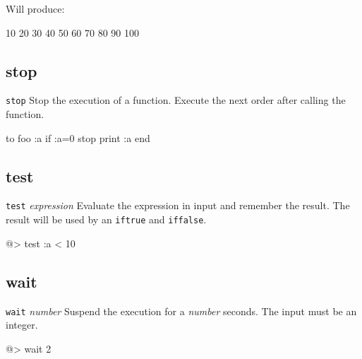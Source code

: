 Will produce: 
 
\begin{verbatimtab} 
10 
20 
30 
40 
50 
60 
70 
80 
90 
100 
\end{verbatimtab}
  
\subsection*{stop}  
 
{\tt stop} 
\newline\newline 
Stop the execution of a function. Execute the next order after calling the function. 
\begin{verbatimtab} 
to foo :a 
	if :a=0 {stop} 
 	print :a 
end 
\end{verbatimtab}
 
\subsection*{test}  
 
{\tt test} {\it expression} 
\newline\newline 
Evaluate the expression in input and remember the result. The result will be used by an {\tt iftrue} and {\tt iffalse}. 
\begin{verbatimtab} 
@> test :a < 10 
\end{verbatimtab}
  
\subsection*{wait}  
 
{\tt wait} {\it number} 
\newline\newline 
Suspend the execution for a {\it number} seconds. The input must be an integer. 
\begin{verbatimtab} 
@> wait 2 
\end{verbatimtab}
